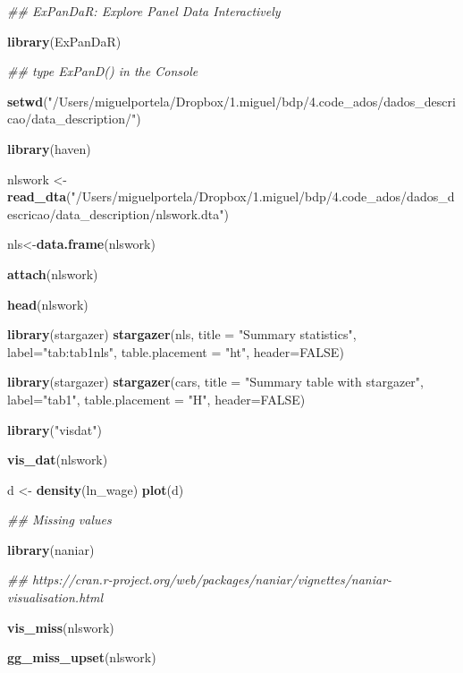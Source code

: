 \documentclass[
  12pt,
]{article}
\newenvironment{Shaded}{\begin{snugshade}}{\end{snugshade}}
\newcommand{\CommentTok}[1]{\textcolor[rgb]{0.56,0.35,0.01}{\textit{#1}}}
\newcommand{\DataTypeTok}[1]{\textcolor[rgb]{0.13,0.29,0.53}{#1}}
\newcommand{\KeywordTok}[1]{\textcolor[rgb]{0.13,0.29,0.53}{\textbf{#1}}}
\newcommand{\NormalTok}[1]{#1}
\newcommand{\OtherTok}[1]{\textcolor[rgb]{0.56,0.35,0.01}{#1}}
\newcommand{\StringTok}[1]{\textcolor[rgb]{0.31,0.60,0.02}{#1}}
\begin{document}
\begin{Shaded}
\begin{Highlighting}[]
\CommentTok{## ExPanDaR: Explore Panel Data Interactively}

  \KeywordTok{library}\NormalTok{(ExPanDaR)}
    
    \CommentTok{## type ExPanD() in the Console}

\KeywordTok{setwd}\NormalTok{(}\StringTok{"/Users/miguelportela/Dropbox/1.miguel/bdp/4.code_ados/dados_descricao/data_description/"}\NormalTok{)}

\KeywordTok{library}\NormalTok{(haven)}

\NormalTok{nlswork <-}\StringTok{ }\KeywordTok{read_dta}\NormalTok{(}\StringTok{"/Users/miguelportela/Dropbox/1.miguel/bdp/4.code_ados/dados_descricao/data_description/nlswork.dta"}\NormalTok{)}

\NormalTok{nls<-}\KeywordTok{data.frame}\NormalTok{(nlswork)}

\KeywordTok{attach}\NormalTok{(nlswork)}

\KeywordTok{head}\NormalTok{(nlswork)}

\KeywordTok{library}\NormalTok{(stargazer)}
\KeywordTok{stargazer}\NormalTok{(nls, }
          \DataTypeTok{title =} \StringTok{"Summary statistics"}\NormalTok{,}
          \DataTypeTok{label=}\StringTok{"tab:tab1nls"}\NormalTok{, }
          \DataTypeTok{table.placement =} \StringTok{"ht"}\NormalTok{, }
          \DataTypeTok{header=}\OtherTok{FALSE}\NormalTok{)}

\KeywordTok{library}\NormalTok{(stargazer)}
\KeywordTok{stargazer}\NormalTok{(cars, }
          \DataTypeTok{title =} \StringTok{"Summary table with stargazer"}\NormalTok{,}
          \DataTypeTok{label=}\StringTok{"tab1"}\NormalTok{, }
          \DataTypeTok{table.placement =} \StringTok{"H"}\NormalTok{, }
          \DataTypeTok{header=}\OtherTok{FALSE}\NormalTok{)}
    
\KeywordTok{library}\NormalTok{(}\StringTok{"visdat"}\NormalTok{)}

\KeywordTok{vis_dat}\NormalTok{(nlswork)}


\NormalTok{d <-}\StringTok{ }\KeywordTok{density}\NormalTok{(ln_wage)}
\KeywordTok{plot}\NormalTok{(d)}

\CommentTok{## Missing values}

\KeywordTok{library}\NormalTok{(naniar)}

\CommentTok{## https://cran.r-project.org/web/packages/naniar/vignettes/naniar-visualisation.html}

\KeywordTok{vis_miss}\NormalTok{(nlswork)}

\KeywordTok{gg_miss_upset}\NormalTok{(nlswork)}


\end{Highlighting}
\end{Shaded}
\end{document}
